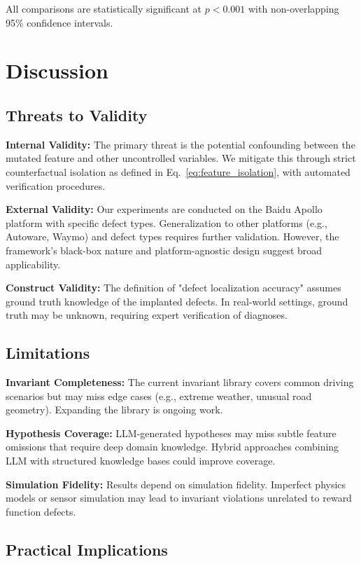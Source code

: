 \documentclass[conference]{IEEEtran}
\theoremstyle{plain}
\begin{document}
All comparisons are statistically significant at $p < 0.001$ with non-overlapping 95\% confidence intervals.

\section{Discussion}
\label{sec:discussion}

\subsection{Threats to Validity}

\textbf{Internal Validity:} The primary threat is the potential confounding between the mutated feature and other uncontrolled variables. We mitigate this through strict counterfactual isolation as defined in Eq.~\ref{eq:feature_isolation}, with automated verification procedures.

\textbf{External Validity:} Our experiments are conducted on the Baidu Apollo platform with specific defect types. Generalization to other platforms (e.g., Autoware, Waymo) and defect types requires further validation. However, the framework's black-box nature and platform-agnostic design suggest broad applicability.

\textbf{Construct Validity:} The definition of "defect localization accuracy" assumes ground truth knowledge of the implanted defects. In real-world settings, ground truth may be unknown, requiring expert verification of diagnoses.

\subsection{Limitations}

\textbf{Invariant Completeness:} The current invariant library covers common driving scenarios but may miss edge cases (e.g., extreme weather, unusual road geometry). Expanding the library is ongoing work.

\textbf{Hypothesis Coverage:} LLM-generated hypotheses may miss subtle feature omissions that require deep domain knowledge. Hybrid approaches combining LLM with structured knowledge bases could improve coverage.

\textbf{Simulation Fidelity:} Results depend on simulation fidelity. Imperfect physics models or sensor simulation may lead to invariant violations unrelated to reward function defects.

\subsection{Practical Implications}
\end{document}
